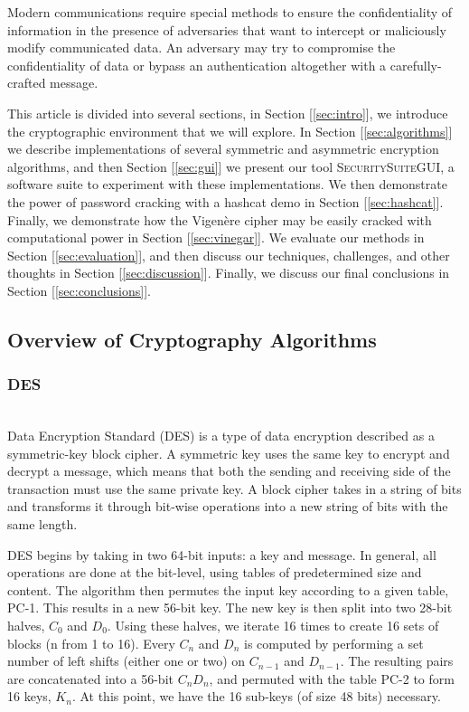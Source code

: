 \documentclass[acmlarge]{acmart}
\begin{document}
Modern communications require special methods to ensure the confidentiality of information in the presence of adversaries that want to intercept or maliciously modify communicated data. An adversary may try to compromise the confidentiality of data or bypass an authentication altogether with a carefully-crafted message.

This article is divided into several sections, in Section [\ref{sec:intro}], we introduce the cryptographic environment that we will explore. In Section [\ref{sec:algorithms}] we describe implementations of several symmetric and asymmetric encryption algorithms, and then Section [\ref{sec:gui}] we present our tool \textsc{SecuritySuiteGUI}, a software suite to experiment with these implementations. We then demonstrate the power of password cracking with a hashcat demo in Section [\ref{sec:hashcat}]. Finally, we demonstrate how the Vigen\`{e}re cipher may be easily cracked with computational power in Section [\ref{sec:vinegar}]. We evaluate our methods in Section [\ref{sec:evaluation}], and then discuss our techniques, challenges, and other thoughts in Section [\ref{sec:discussion}]. Finally, we discuss our final conclusions in Section [\ref{sec:conclusions}].

\subsection{Overview of Cryptography Algorithms}
\subsubsection{DES}
\hspace*{\fill} \\ %
Data Encryption Standard (DES) is a type of data encryption described as a symmetric-key block cipher. A symmetric key uses the same key to encrypt and decrypt a message, which means that both the sending and receiving side of the transaction must use the same private key. A block cipher takes in a string of bits and transforms it through bit-wise operations into a new string of bits with the same length. 

DES begins by taking in two 64-bit inputs: a key and message. In general, all operations are done at the bit-level, using tables of predetermined size and content. The algorithm then permutes the input key according to a given table, PC-1. This results in a new 56-bit key. The new key is then split into two 28-bit halves, $C_{0}$ and $D_{0}$. Using these halves, we iterate 16 times to create 16 sets of blocks (n from 1 to 16). Every $C_{n}$ and  $D_{n}$ is computed by performing a set number of left shifts (either one or two) on $C_{n-1}$ and $D_{n-1}$.
 The resulting pairs are concatenated into a 56-bit $C_{n}D_{n}$, and permuted with the table PC-2 to form 16 keys, $K_{n}$. At this point, we have the 16 sub-keys (of size 48 bits) necessary. 
\end{document}
